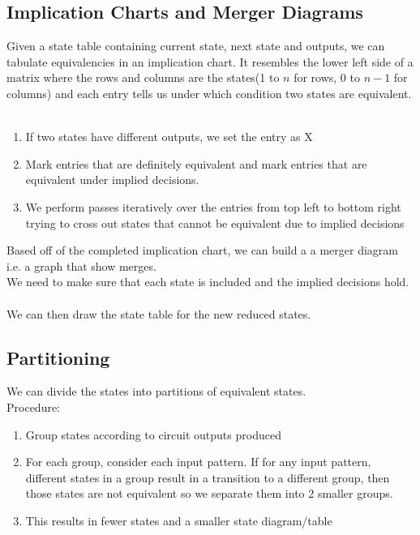 \documentclass[12pt]{report}
\begin{document}
		\subsection{Implication Charts and Merger Diagrams}
			Given a state table containing current state, next state and outputs, we can tabulate equivalencies in an implication chart. It resembles the lower left side of a matrix where the rows and columns are the states(1 to $n$ for rows, 0 to $n-1$ for columns) and each entry tells us under which condition two states are equivalent. \\
			\\
			\begin{enumerate}
				\item If two states have different outputs, we set the entry as X
				\item Mark entries that are definitely equivalent and mark entries that are equivalent under implied decisions.
				\item We perform passes iteratively over the entries from top left to bottom right trying to cross out states that cannot be equivalent due to implied decisions
			\end{enumerate}
			Based off of the completed implication chart, we can build a  a merger diagram i.e. a graph that show merges.\\
			We need to make sure that each state is included and the implied decisions hold.\\
			\\
			We can then draw the state table for the new reduced states.
		\subsection{Partitioning}
			We can divide the states into partitions of equivalent states. \\
			Procedure:\\
			\begin{enumerate}
				\item Group states according to circuit outputs produced
				\item For each group, consider each input pattern. If for any input pattern, different states in a group result in a transition to a different group, then those states are not equivalent so we separate them into 2 smaller groups.
				\item This results in fewer states and a smaller state diagram/table
				
			\end{enumerate}
\end{document}
